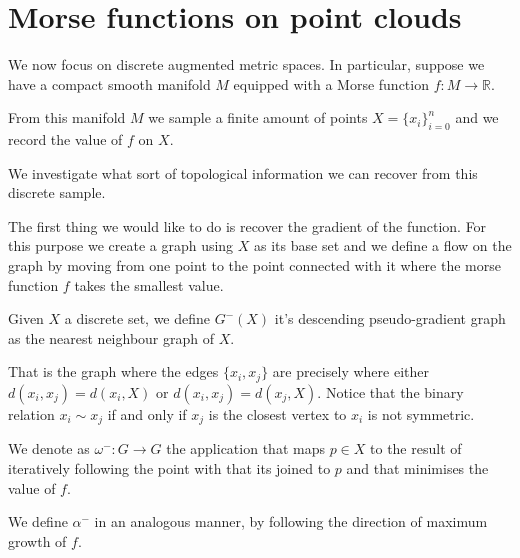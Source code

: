 \chapter{Morse functions on point clouds}

We now focus on discrete augmented metric spaces.
In particular, suppose we have a compact smooth manifold
$M$ equipped with a Morse function $f:M\to \mathbb{R}$.

From this manifold $M$ we sample a finite amount of points 
$X=\{x_i\}_{i=0}^n$ and we record the value of $f$ on $X$.

We investigate what sort of topological information we can recover from this
discrete sample.

The first thing we would like to do is recover the gradient of the function.
For this purpose we create a graph using $X$ as its base set
and we define a flow on the graph by moving from one point to the point
connected with it where the morse function $f$ takes the smallest value.

\begin{definition}

Given $X$ a discrete set,
we define $G^-(X)$ it's descending pseudo-gradient graph
as the nearest neighbour graph of $X$. 

That is the graph where the 
edges $\{x_i,x_j\}$ are precisely where either $d(x_i,x_j)=d(x_i,X)$
or $d(x_i,x_j)=d(x_j,X)$. Notice that the binary relation $x_i\sim x_j$ if 
and only if
$x_j$ is the closest vertex to $x_i$ is not symmetric.

We denote as $\omega^-:G\to G$ the application that
maps $p\in X$ to the result of iteratively following the point
with that its joined to $p$ and that minimises the value of $f$.

We define $\alpha^-$ in an analogous manner, by following the direction 
of maximum growth of $f$.
\end{definition}

